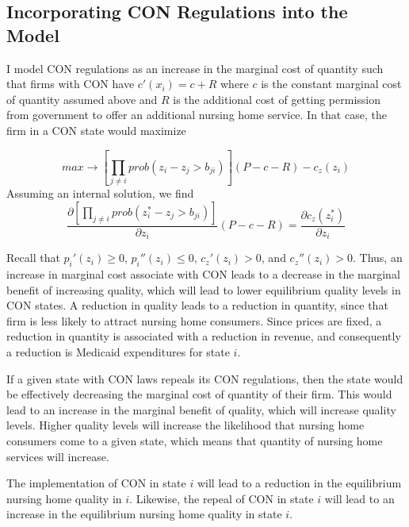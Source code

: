 \documentclass[../Main.tex]{subfiles}
\begin{document}
\subsection{Incorporating CON Regulations into the Model}

I model CON regulations as an increase in the marginal cost of quantity such that firms with CON have $c'(x_i) = c + R$ where $c$ is the constant marginal cost of quantity assumed above and $R$ is the additional cost of getting permission from government to offer an additional nursing home service. In that case, the firm in a CON state would maximize

$$max \rightarrow [\prod_{j\neq i} prob(z_i -z_j > b_{ji})](P-c - R) - c_z(z_i)$$
Assuming an internal solution, we find 
 $$\frac{\partial [\prod_{j\neq i} prob(z_i^* -z_j > b_{ji})]}{\partial z_i}(P-c-R) = \frac{\partial c_z(z_i^*)}{\partial z_i}$$

Recall that $p_{i}'(z_i)\geq 0$, $p_{i}''(z_i) \leq 0$, $c_z'(z_i)>0$, and $c_z''(z_i)>0$. Thus, an increase in marginal cost associate with CON leads to a decrease in the marginal benefit of increasing quality, which will lead to lower equilibrium quality levels in CON states. A reduction in quality leads to a reduction in quantity, since that firm is less likely to attract nursing home consumers. Since prices are fixed, a reduction in quantity is associated with a reduction in revenue, and consequently a reduction is Medicaid expenditures for state $i$. 

If a given state with CON laws repeals its CON regulations, then the state would be effectively decreasing the marginal cost of quantity of their firm. This would lead to an increase in the marginal benefit of quality, which will increase quality levels. Higher quality levels will increase the likelihood that nursing home consumers come to a given state, which means that quantity of nursing home services will increase.



\begin{Proposition}
The implementation of CON in state $i$ will lead to a reduction in the equilibrium nursing home quality in $i$. Likewise, the repeal of CON in state $i$ will lead to an increase in the equilibrium nursing home quality in state $i$. 
\end{Proposition}
\end{document}

